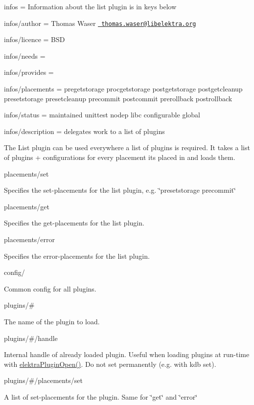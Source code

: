 
\begin{DoxyItemize}
\item infos = Information about the list plugin is in keys below
\item infos/author = Thomas Waser \href{mailto:thomas.waser@libelektra.org}{\texttt{ thomas.\+waser@libelektra.\+org}}
\item infos/licence = B\+SD
\item infos/needs =
\item infos/provides =
\item infos/placements = pregetstorage procgetstorage postgetstorage postgetcleanup presetstorage presetcleanup precommit postcommit prerollback postrollback
\item infos/status = maintained unittest nodep libc configurable global
\item infos/description = delegates work to a list of plugins
\end{DoxyItemize}

The List plugin can be used everywhere a list of plugins is required. It takes a list of plugins + configurations for every placement it\textquotesingle{}s placed in and loads them.

{\ttfamily placements/set}

Specifies the set-\/placements for the list plugin, e.\+g. \char`\"{}presetstorage precommit\char`\"{}

{\ttfamily placements/get}

Specifies the get-\/placements for the list plugin.

{\ttfamily placements/error}

Specifies the error-\/placements for the list plugin.

{\ttfamily config/}

Common config for all plugins.

{\ttfamily plugins/\#}

The name of the plugin to load.

{\ttfamily plugins/\#/handle}

Internal handle of already loaded plugin. Useful when loading plugins at run-\/time with {\ttfamily \mbox{\hyperlink{elektra_2plugin_8c_a32a70a7876542c51d153164ac5108a57}{elektra\+Plugin\+Open()}}}. Do not set permanently (e.\+g. with {\ttfamily kdb set}).

{\ttfamily plugins/\#/placements/set}

A list of set-\/placements for the plugin. Same for \char`\"{}get\char`\"{} and \char`\"{}error\char`\"{}

